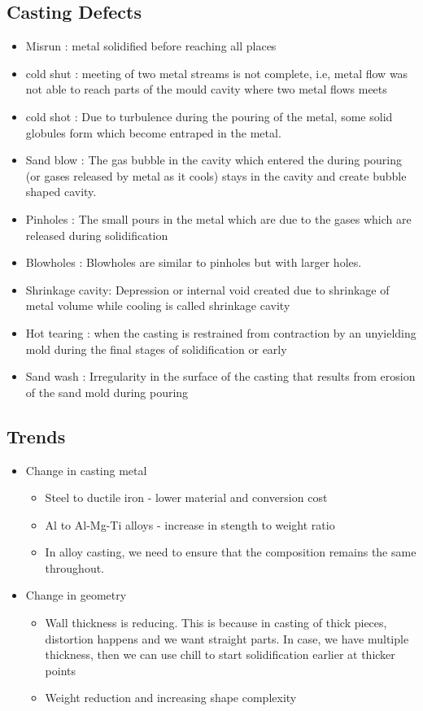 \documentclass{article}
\begin{document}
\subsection{Casting Defects}
\begin{itemize}
 	\item Misrun : metal solidified before reaching all places
 	\item cold shut : meeting of two metal streams is not complete, i.e, metal flow was not able to reach parts of the mould cavity where two metal flows meets
 	\item cold shot : Due to turbulence during the pouring of the metal, some solid globules form which become entraped in the metal. 
	\item Sand blow : The gas bubble in the cavity which entered the during pouring (or gases released by metal as it cools) stays in the cavity and create bubble shaped cavity.
	\item Pinholes : The small pours in the metal which are due to the gases which are released during solidification
	\item Blowholes : Blowholes are similar to pinholes but with larger holes.
	\item Shrinkage cavity: Depression or internal void created due to shrinkage of metal volume while cooling is called shrinkage cavity
	\item Hot tearing : when the casting is restrained from contraction by an unyielding mold during the final stages of solidification or early
	\item Sand wash : Irregularity in the surface of the casting that results from erosion of the sand mold during pouring
\end{itemize}


\subsection{Trends}
\begin{itemize}
	\item Change in casting metal
	\begin{itemize}
	 	\item Steel to ductile iron - lower material and conversion cost
	 	\item Al to Al-Mg-Ti alloys - increase in stength to weight ratio
	 	\item In alloy casting, we need to ensure that the composition remains the same throughout.
	 \end{itemize}
	\item Change in geometry
	\begin{itemize}
		\item Wall thickness is reducing. This is because in casting of thick pieces, distortion happens and we want straight parts. In case, we have multiple thickness, then we can use chill to start solidification earlier at thicker points
		\item Weight reduction and increasing shape complexity
	\end{itemize}
\end{itemize}
\end{document}
